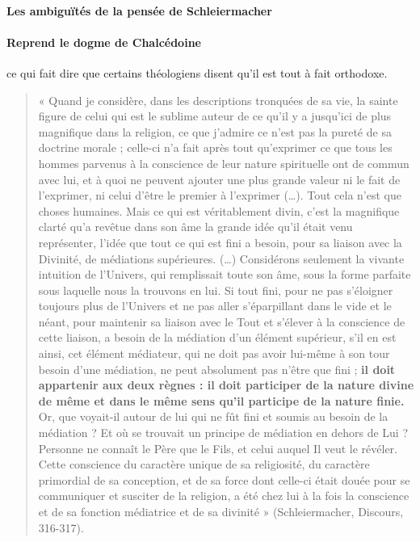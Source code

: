 \paragraph{Les ambiguïtés de la pensée de Schleiermacher} 


\paragraph{Reprend le dogme de Chalcédoine} ce qui fait dire que certains théologiens disent qu'il est tout à fait orthodoxe.

\begin{quote}
    « Quand je considère, dans les descriptions tronquées de sa vie, la sainte figure de celui qui est le sublime auteur de ce qu’il y a jusqu’ici de plus magnifique dans la religion, ce que j’admire ce n’est pas la pureté de sa doctrine morale ; celle-ci n’a fait après tout qu’exprimer ce que tous les hommes parvenus à la conscience de leur nature spirituelle ont de commun avec lui, et à quoi ne peuvent ajouter une plus grande valeur ni le fait de l’exprimer, ni celui d’être le premier à l’exprimer (…). Tout cela n’est que choses humaines. Mais ce qui est véritablement divin, {c’est la magnifique clarté qu’a revêtue dans son âme la grande idée qu’il était venu représenter, l’idée que tout ce qui est fini a besoin, pour sa liaison avec la Divinité, de médiations supérieures.} (…) Considérons seulement la vivante intuition de l’Univers, qui remplissait toute son âme, sous la forme parfaite sous laquelle nous la trouvons en lui. Si tout fini, pour ne pas s’éloigner toujours plus de l’Univers et ne pas aller s’éparpillant dans le vide et le néant, pour maintenir sa liaison avec le Tout et s’élever à la conscience de cette liaison, a besoin de la médiation d’un élément supérieur, s’il en est ainsi, cet élément médiateur, qui ne doit pas avoir lui-même à son tour besoin d’une médiation, ne peut absolument pas n’être que fini ; \textbf{il doit appartenir aux deux règnes : il doit participer de la nature divine de même et dans le même sens qu’il participe de la nature finie.} Or, que voyait-il autour de lui qui ne fût fini et soumis au besoin de la médiation ? Et où se trouvait un principe de médiation en dehors de Lui ? Personne ne connaît le Père que le Fils, et celui auquel Il veut le révéler. Cette conscience du caractère unique de sa religiosité, du caractère primordial de sa conception, et de sa force dont celle-ci était douée pour se communiquer et susciter de la religion, a été chez lui à la fois la conscience et de sa fonction médiatrice et de sa divinité » (Schleiermacher, Discours, 316-317).
\end{quote}

